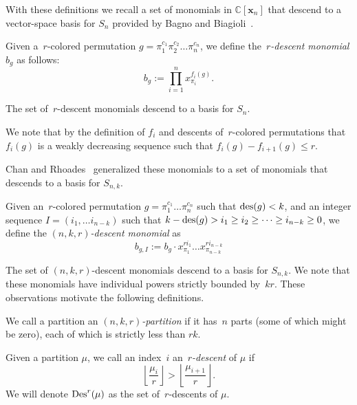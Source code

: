 \documentclass[10pt]{article}
\newcommand{\coloneqq}{:=}
\begin{document}
With these definitions we recall a set of monomials in $\mathbb{C}[\mathbf{x}_n]$ that descend to a vector-space basis for 
$S_n$ provided by Bagno and Biagioli~\cite{BB}.

	\begin{defi}

		Given a~$r$-colored permutation $g=\pi_1^{c_1}\pi_2^{c_2}\ldots \pi_n^{c_n}$, we define the~\emph{$r$-descent 
monomial} $b_g$ as follows:
\begin{equation}
b_g\coloneqq \prod_{i=1}^n x^{f_i(g)}_{\pi_i}.
\end{equation}
	\end{defi}

	The set of~$r$-descent monomials descend to a basis for $S_n$.

We note that by the definition of $f_i$ and descents of~$r$-colored permutations that $f_i(g)$ is a weakly decreasing sequence 
such that $f_i(g)-f_{i+1}(g)\leq r$. 

Chan and Rhoades~\cite{CR} generalized these monomials to a set of monomials that descends to a basis for $S_{n,k}$.

	\begin{defi}

		Given an~$r$-colored permutation $g=\pi_1^{c_1}\ldots \pi_n^{c_n}$ such that $\operatorname{des} (g)<k$, and an integer sequence 
$I=(i_1, \ldots i_{n-k})$ such that $k-\operatorname{des} (g)>i_1\geq i_2\geq\cdots\geq i_{n-k} \geq 0$, we define the 
\emph{$(n,k,r)$-descent monomial} as
\begin{equation}
b_{g,I}\coloneqq b_g\cdot x^{ri_1}_{\pi_1}\ldots 
x^{ri_{n-k}}_{\pi_{n-k}}
\end{equation}
	\end{defi} 

	The set of $(n,k,r)$-descent monomials descend to a basis for $S_{n,k}$.
	We note that these monomials have individual powers strictly bounded by~$kr$. These observations motivate the following 
definitions. 

\begin{defi}

	We call a partition an \emph{$(n,k,r)$-partition} if it has~$n$ parts \textup{(}some of which might be zero\textup{)}, 
each of which is strictly less than $rk$.

\end{defi}

\begin{defi}
	Given a partition $\mu$, we call an index~$i$ an~\emph{$r$-descent} of $\mu$ if
\begin{equation}
\left\lfloor 
\frac{\mu_i}{r}\right\rfloor>\left\lfloor \frac{\mu_{i+1}}{r}\right\rfloor.
\end{equation}
We will denote $\operatorname{Des} ^r(\mu)$ as the set of~$r$-descents of $\mu$.
\end{defi}
\end{document}
